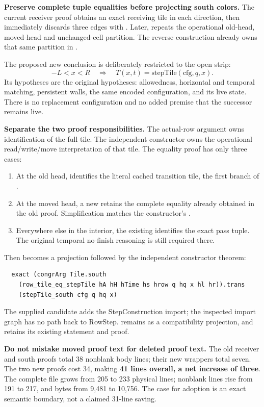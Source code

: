 \textbf{Preserve complete tuple equalities before projecting south colors.} The current receiver proof obtains an exact receiving tile in each direction, then immediately discards three edges with . Later,  repeats the operational old-head, moved-head and unchanged-cell partition. The reverse construction already owns that same partition in .

The proposed new conclusion is deliberately restricted to the open strip:
\[
 -L<x<R\quad\Longrightarrow\quad
 T(x,t)=\mathrm{stepTile}(\mathrm{cfg},q,x).
\]
Its hypotheses are the original  hypotheses: allowedness, horizontal and temporal matching, persistent walls, the same encoded configuration, and its live state. There is no replacement configuration and no added premise that the successor remains live.

\textbf{Separate the two proof responsibilities.} The actual-row argument owns identification of the full tile. The independent constructor owns the operational read/write/move interpretation of that tile. The equality proof has only three cases:
\begin{enumerate}
\item At the old head,  identifies the literal cached transition tile, the first branch of .
\item At the moved head, a new  retains the complete equality already obtained in the old  proof. Simplification matches the constructor's .
\item Everywhere else in the interior, the existing  identifies the exact pass tuple. The original temporal no-finish reasoning is still required there.
\end{enumerate}
Then  becomes a projection followed by the independent constructor theorem:
\begin{lstlisting}
  exact (congrArg Tile.south
    (row_tile_eq_stepTile hA hH hTime hs hrow q hq x hl hr)).trans
    (stepTile_south cfg q hq x)
\end{lstlisting}
The supplied candidate adds the StepConstruction import; the inspected import graph has no path back to RowStep.  remains as a compatibility projection, and  retains its existing statement and proof.

\textbf{Do not mistake moved proof text for deleted proof text.} The old receiver and south proofs total 38 nonblank body lines; their new wrappers total seven. The two new proofs cost 34, making \textbf{41 lines overall, a net increase of three}. The complete file grows from 205 to 233 physical lines; nonblank lines rise from 191 to 217, and bytes from 9,481 to 10,756. The case for adoption is an exact semantic boundary, not a claimed 31-line saving.

